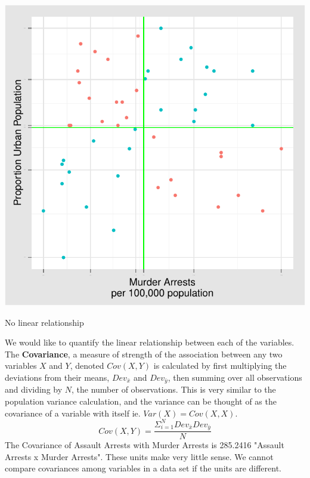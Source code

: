 \documentclass[nohyper,justified]{tufte-handout}\usepackage[]{graphicx}\usepackage[]{color}
\makeatletter
\def\maxwidth{ %
  \ifdim\Gin@nat@width>\linewidth
    \linewidth
  \else
    \Gin@nat@width
  \fi
}
\newenvironment{knitrout}{}{} %
\newcommand{\dev}[1] {Dev_{\bar{#1}}}
\makeatother
\begin{document}
\begin{knitrout}
\color{fgcolor}\begin{marginfigure}

{\centering \includegraphics[width=\maxwidth]{figure/graphics-scatterplotsyz-1} 

}

\caption[No linear relationship]{No linear relationship}\label{fig:scatterplotsyz}
\end{marginfigure}


\end{knitrout}
We would like to quantify the linear relationship between each of the variables. The \textbf{Covariance}, a measure of strength of the association between any two variables $X$ and $Y$, denoted $Cov(X,Y)$ is calculated by first multiplying the deviations from their means, $\dev{x}$ and $\dev{y}$, then summing over all observations and dividing by $N$, the number of observations. This is very similar to the population variance calculation, and the variance can be thought of as the covariance of a variable with itself ie. $Var(X)=Cov(X,X)$. 
\begin{equation*}
Cov(X,Y)=\frac{\Sigma_{i=1}^{N} Dev_{\bar{x}}Dev_{\bar{y}}}{N}
\end{equation*}
The Covariance of Assault Arrests with Murder Arrests is 285.2416 "Assault Arrests x Murder Arrests". These units make very little sense. We cannot compare covariances among variables in a data set if the units are different.
\end{document}
